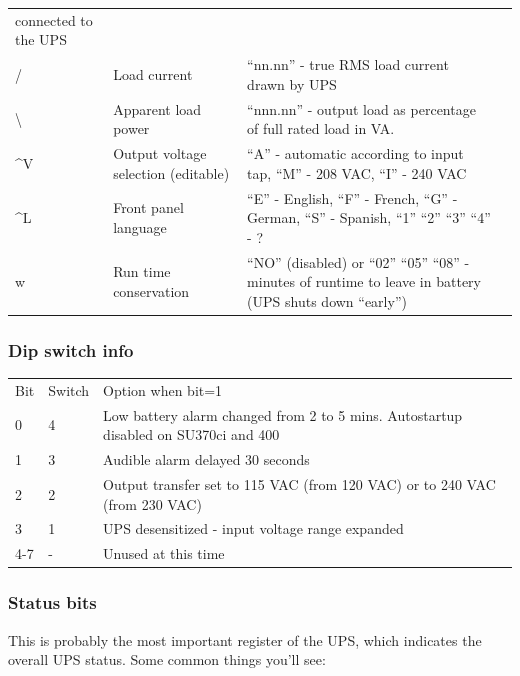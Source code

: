 {{{{{{{{{{{{{{{{{\begin{longtable}{llll}
{connected to the UPS} & { 
 } \\
{/} & {Load current} & {``nn.nn'' - true RMS load current drawn by UPS} & { 
 } \\
{\textbackslash{}} & {Apparent load power} & {``nnn.nn'' - output load as
percentage of full rated load in VA.} & { 
 } \\
{\^{}V} & {Output voltage selection (editable)} & {``A'' - automatic according
to input tap, ``M'' - 208 VAC, ``I'' - 240 VAC} & { 
 } \\
{\^{}L} & {Front panel language} & {``E'' - English, ``F'' - French, ``G'' -
German, ``S'' - Spanish, ``1'' ``2'' ``3'' ``4'' - ?} & { 
 } \\
{w} & {Run time conservation} & {``NO'' (disabled) or ``02'' ``05'' ``08'' -
minutes of runtime to leave in battery (UPS shuts down ``early'')} & {  
}

\end{longtable}

\label{Dip-switch-info}

\subsubsection*{Dip switch info}

\begin{longtable}{lll}
{Bit} & {Switch} & {Option when bit=1 
 } \\
{0} & {4} & {Low battery alarm changed from 2 to 5 mins. Autostartup disabled
on SU370ci and 400 
 } \\
{1} & {3} & {Audible alarm delayed 30 seconds 
 } \\
{2} & {2} & {Output transfer set to 115 VAC (from 120 VAC) or to 240 VAC (from
230 VAC) 
 } \\
{3} & {1} & {UPS desensitized - input voltage range expanded 
 } \\
{4-7} & {-} & {Unused at this time 
}

\end{longtable}

\label{Status-bits}

\subsubsection*{Status bits}

This is probably the most important register of the UPS, which indicates the
overall UPS status. Some common things you'll see:  

}}}}}}}}}}}}}}}}}
